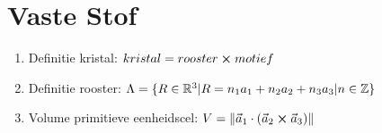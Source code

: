 \documentclass[12pt]{article}
\begin{document}
    \maketitle

	\section{Vaste Stof}%
	\label{sec:vaste_stof}
	
	\begin{enumerate}
		\item Definitie kristal: $ kristal = rooster \cross motief $
		\item Definitie rooster:  $ \Lambda = \{ R \in \mathbb{R}^3 | R = n_1a_1 + n_2a_2 + n_3a_3 | n \in \mathbb{Z} \}$
		\item Volume primitieve eenheidscel: $ V = \|\vec{a}_1 \cdot ( \vec{a}_2 \cross \vec{a}_3 ) \| $
	\end{enumerate}
\end{document}
